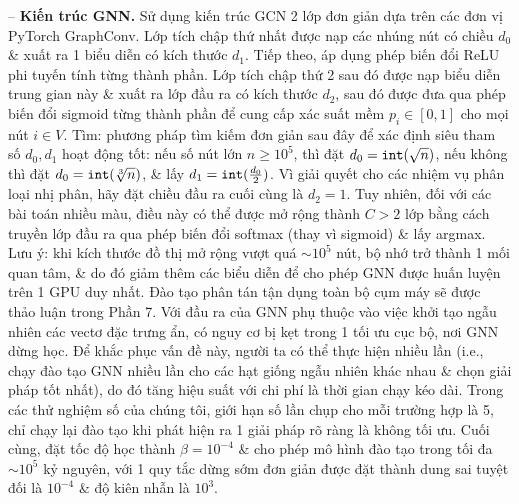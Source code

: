 \documentclass{article}
\begin{document}
\begin{itemize}
    -- {\bf Kiến trúc GNN.} Sử dụng kiến trúc GCN 2 lớp đơn giản dựa trên các đơn vị PyTorch GraphConv. Lớp tích chập thứ nhất được nạp các nhúng nút có chiều $d_0$ \& xuất ra 1 biểu diễn có kích thước $d_1$. Tiếp theo, áp dụng phép biến đổi ReLU phi tuyến tính từng thành phần. Lớp tích chập thứ 2 sau đó được nạp biểu diễn trung gian này \& xuất ra lớp đầu ra có kích thước $d_2$, sau đó được đưa qua phép biến đổi sigmoid từng thành phần để cung cấp xác suất mềm $p_i\in[0,1]$ cho mọi nút $i\in V$. Tìm: phương pháp tìm kiếm đơn giản sau đây để xác định siêu tham số $d_0,d_1$ hoạt động tốt: nếu số nút lớn $n\ge10^5$, thì đặt $d_0 = {\tt int}(\sqrt{n})$, nếu không thì đặt $d_0 = {\tt int}(\sqrt[3]{n})$, \& lấy $d_1 = {\tt int}(\frac{d_0}{2})$. Vì giải quyết cho các nhiệm vụ phân loại nhị phân, hãy đặt chiều đầu ra cuối cùng là $d_2 = 1$. Tuy nhiên, đối với các bài toán nhiều màu, điều này có thể được mở rộng thành $C > 2$ lớp bằng cách truyền lớp đầu ra qua phép biến đổi softmax (thay vì sigmoid) \& lấy argmax. Lưu ý: khi kích thước đồ thị mở rộng vượt quá $\sim10^5$ nút, bộ nhớ trở thành 1 mối quan tâm, \& do đó giảm thêm các biểu diễn để cho phép GNN được huấn luyện trên 1 GPU duy nhất. Đào tạo phân tán tận dụng toàn bộ cụm máy sẽ được thảo luận trong Phần 7. Với đầu ra của GNN phụ thuộc vào việc khởi tạo ngẫu nhiên các vectơ đặc trưng ẩn, có nguy cơ bị kẹt trong 1 tối ưu cục bộ, nơi GNN dừng học. Để khắc phục vấn đề này, người ta có thể thực hiện nhiều lần (i.e., chạy đào tạo GNN nhiều lần cho các hạt giống ngẫu nhiên khác nhau \& chọn giải pháp tốt nhất), do đó tăng hiệu suất với chi phí là thời gian chạy kéo dài. Trong các thử nghiệm số của chúng tôi, giới hạn số lần chụp cho mỗi trường hợp là 5, chỉ chạy lại đào tạo khi phát hiện ra 1 giải pháp rõ ràng là không tối ưu. Cuối cùng, đặt tốc độ học thành $\beta = 10^{-4}$ \& cho phép mô hình đào tạo trong tối đa $\sim10^5$ kỷ nguyên, với 1 quy tắc dừng sớm đơn giản được đặt thành dung sai tuyệt đối là $10^{-4}$ \& độ kiên nhẫn là $10^3$.


\end{itemize}
\end{document}
